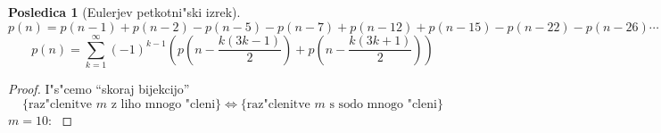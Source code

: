 \documentclass[a4paper,12pt]{article}
\theoremstyle{definition}
\newtheorem{conseq}[counter]{Posledica}
\theoremstyle{remark}
\newcommand{\Z}{\mathbb{Z}}
\begin{document}
\begin{conseq}[Eulerjev petkotni"ski izrek]
	\[p(n) = p(n - 1) + p(n - 2) - p(n - 5) - p(n - 7) + p(n - 12) + p(n - 15) - p(n - 22) - p(n - 26) \cdots\]
	\[p(n) = \sum_{k = 1}^{\infty} (-1)^{k - 1} (p(n - \frac{k (3k - 1)}{2}) + p(n - \frac{k (3k + 1)}{2}))\]
\end{conseq}
\begin{proof}
	I"s"cemo ``skoraj bijekcijo'' \label{TODO: kaj to pomeni?}
	\[\{\text{raz"clenitve $m$ z liho mnogo "cleni}\} \iff \{\text{raz"clenitve $m$ s sodo mnogo "cleni}\}\]
	$m = 10$:
	\label{TODO: kaj se da nardit glede teh diagramov?}
	

\end{proof}
\end{document}
